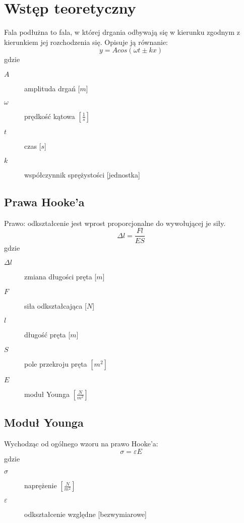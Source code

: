 \documentclass[a4paper,11pt]{article}
\begin{document}
\section{Wstęp teoretyczny} 
 \indent Fala podłużna  to fala, w której drgania odbywają się w kierunku zgodnym z kierunkiem jej rozchodzenia się. 
 Opisuje ją równanie:
\begin{equation}
 y= Acos(\omega t \pm kx) 
\end{equation}  
 gdzie 
 \begin{description}
 \item[$A$] amplituda drgań [$m$]
 \item [$\omega$] prędkość kątowa $\left[\frac{1}{s}\right]$
 \item [$t$] czas [$s$]
 \item [$k$] współczynnik sprężystości [jednostka]
 \end{description}
 
\subsection{Prawa Hooke'a}
Prawo: odkształcenie jest wprost proporcjonalne do wywołującej je siły.
\begin{equation}
  \Delta l = \frac{Fl}{ES} 
\end{equation}
gdzie
\begin{description}
\item [ $\Delta l$] zmiana długości pręta [$m$]
\item [$F$] siła odkształcająca [$N$]
\item [$l$]  długość pręta [$m$]
\item [$S$]  pole przekroju pręta $\left[m^2\right]$
\item [$E$] moduł Younga $\left[\frac{N}{m^2}\right]$
\end{description}
 
 \subsection{Moduł Younga}

\indent Wychodząc od ogólnego wzoru na prawo Hooke'a: 
 \begin{equation}
 \sigma = \varepsilon E 
 \end{equation}
 gdzie
 \begin{description}
  \item [$\sigma $]  naprężenie $\left[\frac{N}{m^2}\right]$
  \item [$\varepsilon$]  odkształcenie względne [bezwymiarowe]
 \end{description}
 
\end{document}
